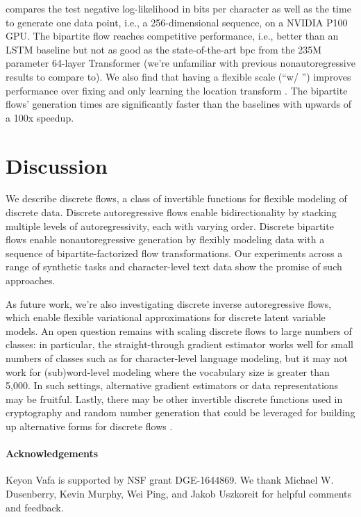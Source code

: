 \documentclass{article}
\begin{document}
 compares the test negative log-likelihood in bits per character as well as the time to generate one data point, i.e., a 256-dimensional sequence, on a NVIDIA P100 GPU. The bipartite flow reaches competitive performance, i.e., better than an LSTM baseline but not as good as the state-of-the-art bpc from the 235M parameter 64-layer Transformer (we're unfamiliar with previous nonautoregressive results to compare to). We also find that having a flexible scale (``w/ '') improves performance over fixing  and only learning the location transform . The bipartite flows' generation times are significantly faster than the baselines with upwards of a 100x speedup.







\section{Discussion}

We describe discrete flows, a class of invertible functions for flexible modeling of discrete data. Discrete autoregressive flows enable bidirectionality by stacking multiple levels of autoregressivity, each with varying order. Discrete bipartite flows enable nonautoregressive generation by flexibly modeling data with a sequence of bipartite-factorized flow transformations. Our experiments across a range of synthetic tasks and character-level text data show the promise of such approaches.

As future work, we're also investigating discrete inverse autoregressive flows, which enable flexible variational approximations for discrete latent variable models. An open question remains with scaling discrete flows to large numbers of classes: in particular, the straight-through gradient estimator works well for small numbers of classes such as for character-level language modeling, but it may not work for (sub)word-level modeling where the vocabulary size is greater than 5,000. In such settings, alternative gradient estimators or data representations may be fruitful. Lastly, there may be other invertible discrete functions used in cryptography and random number generation that could be leveraged for building up alternative forms for discrete flows \citep{salmon2011parallel}.

\paragraph{Acknowledgements}
Keyon Vafa is supported by NSF grant DGE-1644869.
We thank Michael W. Dusenberry, Kevin Murphy, Wei Ping, and Jakob Uszkoreit for helpful comments and feedback.
\end{document}
